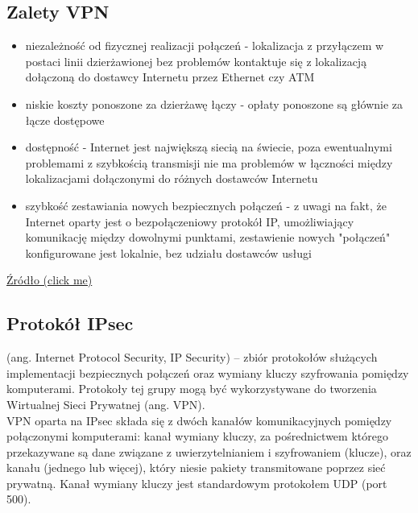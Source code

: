 \documentclass[12pt]{article}
\begin{document}
    \subsection{Zalety VPN}
    \begin{itemize}
        \item niezależność od fizycznej realizacji połączeń - lokalizacja z przyłączem w postaci linii dzierżawionej bez problemów kontaktuje się z lokalizacją dołączoną do dostawcy Internetu przez Ethernet czy ATM
        \item niskie koszty ponoszone za dzierżawę łączy - opłaty ponoszone są głównie za łącze dostępowe
        \item dostępność - Internet jest największą siecią na świecie, poza ewentualnymi problemami z szybkością transmisji nie ma problemów w łączności między lokalizacjami dołączonymi do różnych dostawców Internetu
        \item szybkość zestawiania nowych bezpiecznych połączeń - z uwagi na fakt, że Internet oparty jest o bezpołączeniowy protokół IP, umożliwiający komunikację między dowolnymi punktami, zestawienie nowych "połączeń" konfigurowane jest lokalnie, bez udziału dostawców usługi
    \end{itemize}
    
    \href{http://students.mimuw.edu.pl/SO/Projekt02-03/temat4-g1/Darek/VirtualPrivateNetwork.html}{Źródło (click me)}

    \subsection{Protokół IPsec}
    
    (ang. Internet Protocol Security, IP Security) – zbiór protokołów służących implementacji bezpiecznych połączeń oraz wymiany kluczy szyfrowania pomiędzy komputerami. Protokoły tej grupy mogą być wykorzystywane do tworzenia Wirtualnej Sieci Prywatnej (ang. VPN).\\

    VPN oparta na IPsec składa się z dwóch kanałów komunikacyjnych pomiędzy połączonymi komputerami: kanał wymiany kluczy, za pośrednictwem którego przekazywane są dane związane z uwierzytelnianiem i szyfrowaniem (klucze), oraz kanału (jednego lub więcej), który niesie pakiety transmitowane poprzez sieć prywatną. Kanał wymiany kluczy jest standardowym protokołem UDP (port 500).
    
\end{document}
